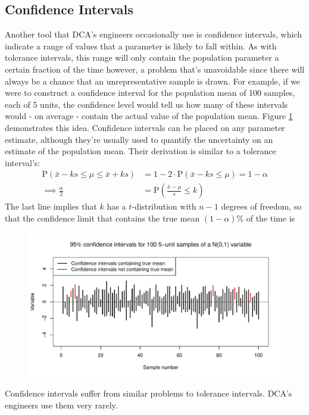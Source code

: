\documentclass[11pt,a4paper,article]{memoir} %
\begin{document}
\subsection*{Confidence Intervals}
Another tool that DCA's engineers occasionally use is confidence intervals, which indicate a range of values that a parameter is likely to fall within. As with tolerance intervals, this range will only contain the population parameter a certain fraction of the time however, a problem that's unavoidable since there will always be a chance that an unrepresentative sample is drawn. For example, if we were to construct a confidence interval for the population mean of 100 samples, each of 5 units, the confidence level would tell us how many of these intervals would - on average - contain the actual value of the population mean. Figure \ref{fig:confidence_intervals} demonstrates this idea. Confidence intervals can be placed on any parameter estimate, although they're usually used to quantify the uncertainty on an estimate of the population mean. Their derivation is similar to a tolerance interval's:
\begin{align}
	\text{P}(\bar{x} - ks \leq \mu \leq \bar{x} + ks) &= 1 - 2\cdot \text{P}(\bar{x} - ks \leq \mu) = 1 - \alpha \nonumber\\
	\implies \frac{\alpha}{2} &= \text{P}(\frac{\bar{x} - \mu}{s} \leq k) 
\end{align}
The last line implies that $k$ has a $t$-distribution with $n - 1$ degrees of freedom, so that the confidence limit that contains the true mean $(1 - \alpha)\%$ of the time is
\begin{equation}
	[\bar{x} - t_{n-1}(\alpha)\cdot s, \ \bar{x} + t_{n-1}(\alpha)\cdot s]
\end{equation}
\begin{figure}[H]
\includegraphics[width=\textwidth]{confidence_intervals.pdf}
\caption{}
\label{fig:confidence_intervals}
\end{figure}
Confidence intervals suffer from similar problems to tolerance intervals. DCA's engineers use them very rarely.
\end{document}
